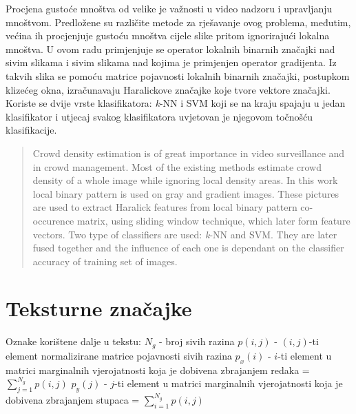 \documentclass[times, utf8, zavrsni]{fer}
\begin{document}



\listoffigures
\listoftables

\begin{sazetak}
Procjena gustoće mnoštva od velike je važnosti u video nadzoru i upravljanju mnoštvom. Predložene
su različite metode za rješavanje ovog problema, međutim, većina ih procjenjuje gustoću mnoštva
cijele slike pritom ignorirajući lokalna mnoštva. U ovom radu primjenjuje se operator lokalnih binarnih
značajki nad sivim slikama i sivim slikama nad kojima je primjenjen operator gradijenta. Iz takvih slika
se pomoću matrice pojavnosti lokalnih binarnih značajki, postupkom klizećeg okna, izračunavaju
 Haralickove značajke koje tvore vektore značajki. Koriste se dvije vrste klasifikatora: \textit{k}-NN i SVM koji 
se na kraju spajaju u jedan klasifikator i utjecaj svakog klasifikatora uvjetovan je njegovom točnošću 
klasifikacije.

\end{sazetak}

\begin{abstract}
Crowd density estimation is of great importance in video surveillance and in crowd management. 
Most of the existing methods estimate crowd density of a whole image while ignoring local density areas.
In this work local binary pattern is used on gray and gradient images. These pictures are used to 
extract Haralick features from local binary pattern co-occurence matrix, using sliding window
technique, which later form feature vectors. Two type of classifiers are used: \textit{k}-NN and SVM.
They are later fused together and the influence of each one is dependant on the classifier accuracy of 
training set of images.

\end{abstract}

\appendix

\chapter{Teksturne značajke}

Oznake korištene dalje u tekstu:
\bigbreak
\(N_g\) - broj sivih razina
\(p(i,j)\) - \((i,j)\)-ti element normalizirane matrice pojavnosti sivih razina
\bigbreak
\(p_x(i)\) - \(i\)-ti element u matrici marginalnih vjerojatnosti koja je dobivena 
zbrajanjem redaka = \(\sum_{j=1}^{N_g}p(i,j)\)
\bigbreak
\(p_y(j)\) - \(j\)-ti element u matrici marginalnih vjerojatnosti koja je dobivena 
zbrajanjem stupaca = \(\sum_{i=1}^{N_g}p(i,j)\)
\end{document}
